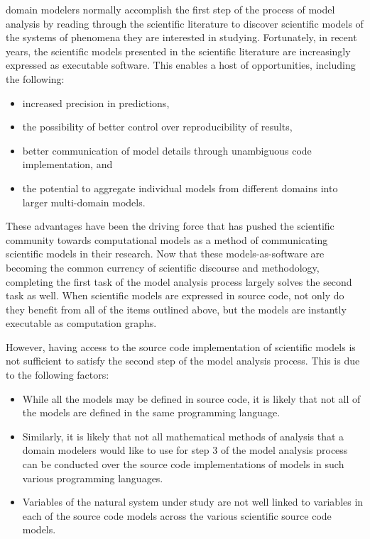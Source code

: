 domain modelers normally accomplish the first step of the process of model analysis by reading through the scientific literature to discover scientific models of the systems of phenomena they are interested in studying.
Fortunately, in recent years, the scientific models presented in the scientific literature are increasingly expressed as executable software.
This enables a host of opportunities, including the following:
\begin{itemize}
\item increased precision in predictions,
\item the possibility of better control over reproducibility of results,
\item better communication of model details through unambiguous code implementation, and
\item the potential to aggregate individual models from different domains into larger multi-domain models.
\end{itemize}
These advantages have been the driving force that has pushed the scientific community towards computational models as a method of communicating scientific  models in their research.
Now that these models-as-software are becoming the common currency of scientific discourse and methodology, completing the first task of the model analysis process largely solves the second task as well.
When scientific models are expressed in source code, not only do they benefit from all of the items outlined above, but the models are instantly executable as computation graphs.

However, having access to the source code implementation of scientific models is not sufficient to satisfy the second step of the model analysis process.
This is due to the following factors:
\begin{itemize}
  \item While all the models may be defined in source code, it is likely that not all of the models are defined in the same programming language.
  \item Similarly, it is likely that not all mathematical methods of analysis that a domain modelers would like to use for step 3 of the model analysis process can be conducted over the source code implementations of models in such various programming languages.
  \item Variables of the natural system under study are not well linked to variables in each of the source code models across the various scientific source code models.
\end{itemize}

